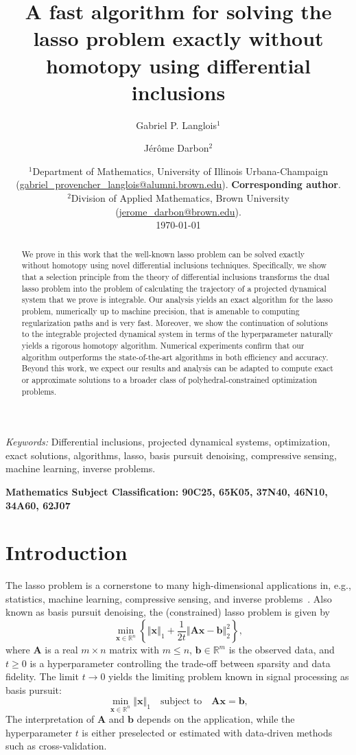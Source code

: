 \documentclass[11pt]{article}
\title{A fast algorithm for solving the lasso problem exactly without homotopy using differential inclusions}
\author{Gabriel P. Langlois$^1$ \and J\'er\^ome Darbon$^2$}
\date{%
    $^1$Department of Mathematics, University of Illinois Urbana-Champaign (\url{gabriel_provencher_langlois@alumni.brown.edu}). \textbf{Corresponding author}.\\%
    $^2$Division of Applied Mathematics, Brown University (\url{jerome_darbon@brown.edu}).\\[2ex]%
    \today
}
\numberwithin{prop}{section}
\numberwithin{lem}{section}
\numberwithin{rem}{section}
\numberwithin{cor}{section}
\numberwithin{thm}{section}
\numberwithin{defn}{section}
\numberwithin{fact}{section}
\theoremstyle{plain}
\def\bb {\boldsymbol{b}}
\def\bx {\boldsymbol{x}}
\def\R {\mathbb{R}}
\newcommand{\normsq}[1]{\left\Vert{#1} \right\Vert_{2}^{2}}
\newcommand{\normone}[1]{\left\Vert{#1} \right\Vert_{1}}
\newcommand{\matr}[1]{\bm{#1}}
\def\Rn {\R^n}
\def\Rm {\R^m}
\begin{document}
\maketitle
\begin{abstract}
We prove in this work that the well-known lasso problem can be solved exactly without homotopy using novel differential inclusions techniques. Specifically, we show that a selection principle from the theory of differential inclusions transforms the dual lasso problem into the problem of calculating the trajectory of a projected dynamical system that we prove is integrable. Our analysis yields an exact algorithm for the lasso problem, numerically up to machine precision, that is amenable to computing regularization paths and is very fast. Moreover, we show the continuation of solutions to the integrable projected dynamical system in terms of the hyperparameter naturally yields a rigorous homotopy algorithm. Numerical experiments confirm that our algorithm outperforms the state-of-the-art algorithms in both efficiency and accuracy. Beyond this work, we expect our results and analysis can be adapted to compute exact or approximate solutions to a broader class of polyhedral-constrained optimization problems.
\end{abstract}

\noindent \textit{Keywords:} Differential inclusions, projected dynamical systems, optimization, exact solutions, algorithms, lasso, basis pursuit denoising, compressive sensing, machine learning, inverse problems.

\medskip
\noindent \textbf{Mathematics Subject Classification: 90C25, 65K05, 37N40, 46N10, 34A60, 62J07}

\section{Introduction}\label{sec:intro}
The lasso problem is a cornerstone to many high-dimensional applications in, e.g., statistics, machine learning, compressive sensing, and inverse problems~\cite{chen2001atomic,tibshirani1996regression,nikolova2002minimizers,vossen2006l1,stadler2009elliptic}. Also known as basis pursuit denoising, the (constrained) lasso problem is given by\begin{equation}\label{eq:lasso_primal}\tag{LASSO}
\min_{\bx \in \Rn} \left\{\normone{\bx} + \frac{1}{2t}\normsq{\matr{A}\bx - \bb}\right\},
\end{equation}
where $\matr{A}$ is a real $m \times n$ matrix with $m \leqslant n$, $\bb \in \Rm$ is the observed data, and $t \geqslant 0$ is a hyperparameter controlling the trade-off between sparsity and data fidelity. The limit $t \to 0$ yields the limiting problem known in signal processing as basis pursuit:
\begin{equation}\label{eq:BP_primal}\tag{BP}
\min_{\bx \in \Rn} \normone{\bx} \quad \text{subject to} \quad \matr{A}\bx = \bb,
\end{equation}
The interpretation of $\matr{A}$ and $\bb$ depends on the application, while the hyperparameter $t$ is either preselected or estimated with data-driven methods such as cross-validation.
\end{document}

